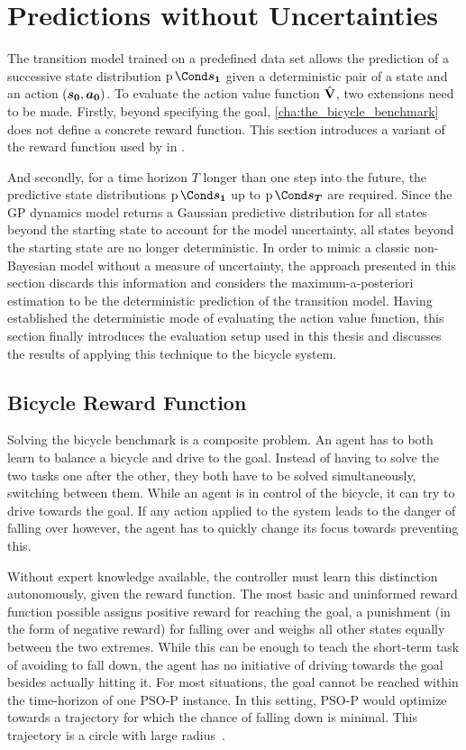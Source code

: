 \section{Predictions without Uncertainties}
The transition model trained on a predefined data set allows the prediction of a successive state distribution $\Prob{\mat{s_1}}$ given a deterministic pair of a state and an action $(\bm{s_0}, \bm{a_0})$.
To evaluate the action value function $\operatorname{\hat{\operatorname{\mathbf{V}}}}$, two extensions need to be made.
Firstly, beyond specifying the goal, \cref{cha:the_bicycle_benchmark} does not define a concrete reward function.
This section introduces a variant of the reward function used by \citeauthor{randlov_learning_1998} in \cite{randlov_learning_1998}.

And secondly, for a time horizon $T$ longer than one step into the future, the predictive state distributions $\Prob{\mat{s_1}}$ up to $\Prob{\mat{s_T}}$ are required.
Since the GP dynamics model returns a Gaussian predictive distribution for all states beyond the starting state to account for the model uncertainty, all states beyond the starting state are no longer deterministic.
In order to mimic a classic non-Bayesian model without a measure of uncertainty, the approach presented in this section discards this information and considers the maximum-a-posteriori estimation to be the deterministic prediction of the transition model.
Having established the deterministic mode of evaluating the action value function, this section finally introduces the evaluation setup used in this thesis and discusses the results of applying this technique to the bicycle system.

\subsection{Bicycle Reward Function}
\label{sub:reward_function}
Solving the bicycle benchmark is a composite problem.
An agent has to both learn to balance a bicycle and drive to the goal.
Instead of having to solve the two tasks one after the other, they both have to be solved simultaneously, switching between them.
While an agent is in control of the bicycle, it can try to drive towards the goal.
If any action applied to the system leads to the danger of falling over however, the agent has to quickly change its focus towards preventing this.

Without expert knowledge available, the controller must learn this distinction autonomously, given the reward function.
The most basic and uninformed reward function possible assigns positive reward for reaching the goal, a punishment (in the form of negative reward) for falling over and weighs all other states equally between the two extremes.
While this can be enough to teach the short-term task of avoiding to fall down, the agent has no initiative of driving towards the goal besides actually hitting it.
For most situations, the goal cannot be reached within the time-horizon of one PSO-P instance.
In this setting, PSO-P would optimize towards a trajectory for which the chance of falling down is minimal.
This trajectory is a circle with large radius~\cite{randlov_learning_1998}.

